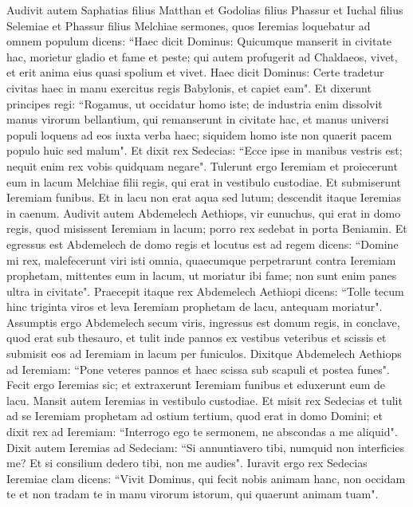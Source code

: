 \begin{biblechapter}  
\verse Audivit autem Saphatias filius Matthan et Godolias filius Phassur et Iuchal filius Selemiae et Phassur filius Melchiae sermones, quos Ieremias loquebatur ad omnem populum dicens: 
\verse “Haec dicit Dominus: Quicumque manserit in civitate hac, morietur gladio et fame et peste; qui autem profugerit ad Chaldaeos, vivet, et erit anima eius quasi spolium et vivet. 
\verse Haec dicit Dominus: Certe tradetur civitas haec in manu exercitus regis Babylonis, et capiet eam". 
\verse Et dixerunt principes regi: “Rogamus, ut occidatur homo iste; de industria enim dissolvit manus virorum bellantium, qui remanserunt in civitate hac, et manus universi populi loquens ad eos iuxta verba haec; siquidem homo iste non quaerit pacem populo huic sed malum". 
\verse Et dixit rex Sedecias: “Ecce ipse in manibus vestris est; nequit enim rex vobis quidquam negare". 
\verse Tulerunt ergo Ieremiam et proiecerunt eum in lacum Melchiae filii regis, qui erat in vestibulo custodiae. Et submiserunt Ieremiam funibus. Et in lacu non erat aqua sed lutum; descendit itaque Ieremias in caenum. 
\verse Audivit autem Abdemelech Aethiops, vir eunuchus, qui erat in domo regis, quod misissent Ieremiam in lacum; porro rex sedebat in porta Beniamin. 
\verse Et egressus est Abdemelech de domo regis et locutus est ad regem dicens: 
\verse “Domine mi rex, malefecerunt viri isti omnia, quaecumque perpetrarunt contra Ieremiam prophetam, mittentes eum in lacum, ut moriatur ibi fame; non sunt enim panes ultra in civitate". 
\verse Praecepit itaque rex Abdemelech Aethiopi dicens: “Tolle tecum hinc triginta viros et leva Ieremiam prophetam de lacu, antequam moriatur". 
\verse Assumptis ergo Abdemelech secum viris, ingressus est domum regis, in conclave, quod erat sub thesauro, et tulit inde pannos ex vestibus veteribus et scissis et submisit eos ad Ieremiam in lacum per funiculos. 
\verse Dixitque Abdemelech Aethiops ad Ieremiam: “Pone veteres pannos et haec scissa sub scapuli et postea funes". Fecit ergo Ieremias sic;  
\verse et extraxerunt Ieremiam funibus et eduxerunt eum de lacu. Mansit autem Ieremias in vestibulo custodiae. 
\verse Et misit rex Sedecias et tulit ad se Ieremiam prophetam ad ostium tertium, quod erat in domo Domini; et dixit rex ad Ieremiam: “Interrogo ego te sermonem, ne abscondas a me aliquid". 
\verse Dixit autem Ieremias ad Sedeciam: “Si annuntiavero tibi, numquid non interficies me? Et si consilium dedero tibi, non me audies". 
\verse Iuravit ergo rex Sedecias Ieremiae clam dicens: “Vivit Dominus, qui fecit nobis animam hanc, non occidam te et non tradam te in manu virorum istorum, qui quaerunt animam tuam". 

\end{biblechapter}
